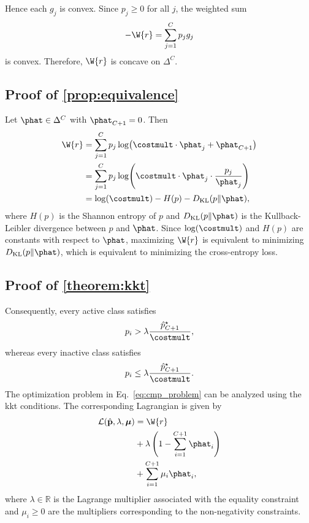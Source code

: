 Hence each $g_j$ is convex. Since $p_j\ge0$ for all $j$, the weighted sum
\begin{align*}
    -\W{r}
    =
    \sum_{j=1}^{C}p_j g_j
\end{align*}
is convex. Therefore, $\W{r}$ is concave on $\Delta^C$.

\subsection{Proof of \cref{prop:equivalence}}
\label{subsec:proof_equivalence}
\propEquivalence*

Let $\phat\in\Delta^C$ with $\phat_{C+1}=0$. Then
\begin{align*}
    \W{r}
     & =
    \sum_{j=1}^{C}p_j\log\!\left(\costmult\cdot\phat_j+\phat_{C+1}\right)             \\
     & =
    \sum_{j=1}^{C}p_j\log\!\left(\costmult\cdot\phat_j\cdot\frac{p_j}{\phat_j}\right) \\
     & =
    \log\!\left(\costmult\right)
    -
    H(p)
    -
    D_{\text{KL}}(p\| \phat),
\end{align*}
where $H(p)$ is the Shannon entropy of $p$ and $D_{\text{KL}}(p\| \phat)$ is the Kullback-Leibler divergence between $p$ and $\phat$. Since $\log\!\left(\costmult\right)$ and $H(p)$ are constants with respect to $\phat$, maximizing $\W{r}$ is equivalent to minimizing $D_{\text{KL}}(p\| \phat)$, which is equivalent to minimizing the cross-entropy loss.

\subsection{Proof of \cref{theorem:kkt}}
\label{sec:proof_kkt_conditions}
\theoremKKT*
Consequently, every active class satisfies
\begin{align}
    p_i>\lambda\frac{\hat p_{C+1}^\star}{\costmult},
\end{align}
whereas every inactive class satisfies
\begin{align}
    p_i\le
    \lambda\frac{\hat p_{C+1}^\star}{\costmult}.
\end{align}
The optimization problem in Eq.~\eqref{eq:cmp_problem} can be analyzed using the \gls*{kkt} conditions. The corresponding Lagrangian is given by
\begin{align*}
    \mathcal{L}(\hat{\mathbf{p}}, \lambda, \boldsymbol{\mu})
     & =
    \W{r}                                          \\
     &
    +\lambda\left(1-\sum_{i=1}^{C+1}\phat_i\right) \\
     &
    +\sum_{i=1}^{C+1}\mu_i\phat_i,
\end{align*}
where $\lambda\in\mathbb{R}$ is the Lagrange multiplier associated with the equality constraint and $\mu_i\ge0$ are the multipliers corresponding to the non-negativity constraints.

